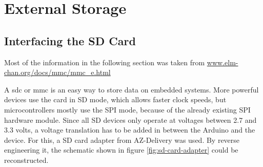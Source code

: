 \setchapterpreamble[u]{\margintoc}

\chapter{External Storage}

\section{Interfacing the SD Card}
\label{sec:interfacing-the-sd-card}

Most of the information in the following section was taken from \href{http://www.elm-chan.org/docs/mmc/mmc_e.html}{www.elm-chan.org/docs/mmc/mmc\_e.html}

A \gls{sdc} or \gls{mmc} is an easy way to store data on embedded systems. More powerful devices use the card in SD mode, which allows faster clock speeds, but microcontrollers mostly use the SPI mode, because of the already existing SPI hardware module. Since all SD devices only operate at voltages between 2.7 and 3.3 volts, a voltage translation has to be added in between the Arduino and the device. For this, a SD card adapter from AZ-Delivery was used. By reverse engineering it, the schematic shown in figure \ref{fig:sd-card-adapter} could be reconstructed.

